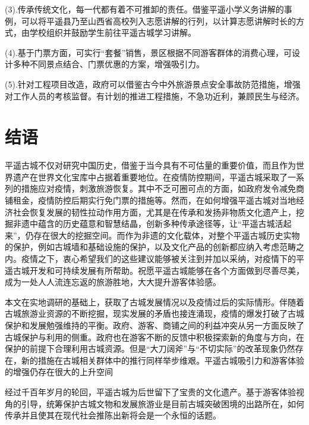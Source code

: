 \documentclass[UTF8]{ctexart}
\begin{document}
    (3).传承传统文化，每一代都有着不可推卸的责任。借鉴平遥小学义务讲解的事例，可以将平遥县乃至山西省高校列入志愿讲解的行列，以计算志愿讲解时长的方式，由学校组织并鼓励学生前往平遥古城学习讲解。
    
    (4).基于门票方面，可实行“套餐”销售，景区根据不同游客群体的消费心理，可设计多种不同景点结合、门票优惠的方案，增强吸引力。
    
    (5).针对工程项目改造，政府可以借鉴古今中外旅游景点安全事故防范措施，增强对工作人员的考核监督。有计划的推进工程措施，不急功近利，兼顾民生与经济。  
\section{结语}
平遥古城不仅对研究中国历史，借鉴于当今具有不可估量的重要价值，而且作为世界遗产在世界文化宝库中占据着重要地位。在疫情防控期间，平遥古城采取了一系列的措施应对疫情，刺激旅游恢复。其中不乏可圈可点的方面，如政府发令减免商铺租金，疫情防控后期实行免门票的措施等。然而，在如何增强平遥古城对当地经济社会恢复发展的韧性拉动作用方面，尤其是在传承和发扬非物质文化遗产上，挖掘非遗中蕴含的历史蕴意和智慧结晶，创新多种传承途径等，让“平遥古城活起来”，仍存在很大的挖掘空间。而作为非遗的文化载体，对整个平遥古城历史实物的保护，例如古城墙和基础设施的保护，以及文化产品的创新都应纳入考虑范畴之内。疫情之下，衷心希望我们的这些建议能够被关注到并加以采纳，对疫情下的平遥古城开发和可持续发展有所帮助。祝愿平遥古城能够在各个方面做到尽善尽美，成为一处人人流连忘返的旅游胜地，大大提升游客体验感。
    
本文在实地调研的基础上，获取了古城发展情况以及疫情过后的实际情形。伴随着古城旅游业资源的不断挖掘，现实发展的矛盾也接连涌现，疫情的爆发打破了古城保护和发展勉强维持的平衡。政府、游客、商铺之间的利益冲突从另一方面反映了古城保护与利用的侧重。政府也在游客不断的反馈中积极探索新的角度与方向，在保护的前提下合理利用古城资源。但是“大刀阔斧”与“不切实际”的改革现象仍然存在，新的措施在古城相关群体中的推行同样举步维艰。平遥古城吸引力和游客体验的增强仍存在很大的上升空间
    
经过千百年岁月的轮回，平遥古城为后世留下了宝贵的文化遗产。基于游客体验视角的引导，统筹保护古城文物和发展旅游业是目前古城突破困境的出路所在，如何传承并且使其在现代社会推陈出新将会是一个永恒的话题。
    
\nocite{*}

    
\end{document}
